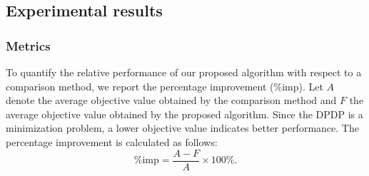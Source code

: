 \documentclass[pdflatex]{sn-jnl}
\begin{document}







\subsection{Experimental results}
\subsubsection{Metrics}
To quantify the relative performance of our proposed algorithm with respect to a comparison method, we report the percentage improvement (\%imp). Let $A$ denote the average objective value obtained by the comparison method and $F$ the average objective value obtained by the proposed algorithm. Since the DPDP is a minimization problem, a lower objective value indicates better performance. The percentage improvement is calculated as follows:
\[
\text{\%imp} = \frac{A-F}{A} \times 100\%.
\]
\end{document}
